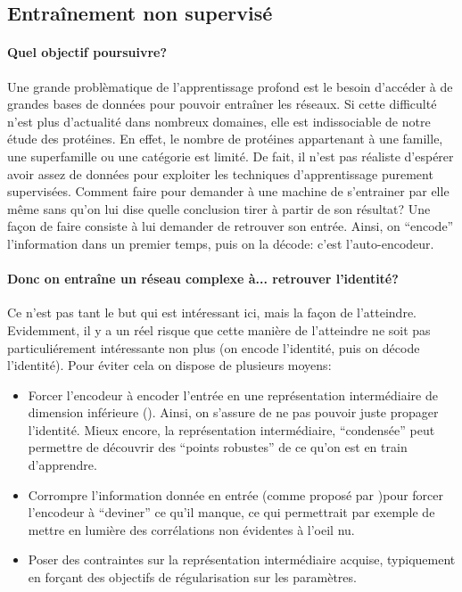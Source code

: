 \documentclass[a4paper, 11pt, onecolumn]{article}
\begin{document}
\subsection{Entraînement non supervisé}

\paragraph{Quel objectif poursuivre?}

Une grande problèmatique de l'apprentissage profond est le besoin d'accéder à de
grandes bases de données pour pouvoir entraîner les réseaux. Si cette difficulté
n'est plus d'actualité dans nombreux domaines, elle est indissociable de notre
étude des protéines. En effet, le nombre de protéines appartenant à une famille,
une superfamille ou une catégorie est limité. De fait, il n'est pas réaliste
d'espérer avoir assez de données pour exploiter les techniques d'apprentissage
purement supervisées. Comment faire pour demander à une machine de s'entrainer par elle même sans
qu'on lui dise quelle conclusion tirer à partir de son résultat? Une façon de
faire consiste à lui demander de retrouver son entrée. Ainsi, on ``encode''
l'information dans un premier temps, puis on la \og décode\fg : c'est l'auto-encodeur.

\paragraph{Donc on entraîne un réseau complexe à... retrouver l'identité?}

Ce n'est pas tant le but qui est intéressant ici, mais la façon de l'atteindre.
Evidemment, il y a un réel risque que cette manière de l'atteindre ne soit pas
particuliérement intéressante non plus (on encode l'identité, puis on décode
l'identité). Pour éviter cela on dispose de plusieurs moyens:

\begin{itemize}
\item Forcer l'encodeur à encoder l'entrée en une représentation intermédiaire
  de dimension inférieure (\cite{hinton2006reducing}). Ainsi, on s'assure de ne pas pouvoir juste propager
  l'identité. Mieux encore, la représentation intermédiaire, ``condensée'' peut
  permettre de découvrir des ``points robustes'' de ce qu'on est en train
  d'apprendre.
\item Corrompre l'information donnée en entrée (comme proposé par \cite{Vincent:2008:ECR:1390156.1390294})pour forcer l'encodeur à
  ``deviner'' ce qu'il manque, ce qui permettrait par exemple de mettre en
  lumière des corrélations non évidentes à l'oeil nu.
\item Poser des contraintes sur la représentation intermédiaire acquise,
  typiquement en forçant des objectifs de régularisation sur les paramètres.
\end{itemize}
\end{document}
